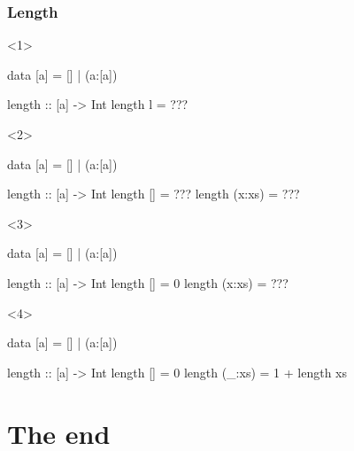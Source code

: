 \documentclass[17pt]{beamer}
\renewcommand{\(}[1]{\begin{columns}[#1]}
\renewcommand{\)}{\end{columns}}
\newcommand{\<}[1]{\begin{column}{#1}}
\renewcommand{\>}{\end{column}}
\begin{document}
\begin{frame}[fragile]
\frametitle{Length}
\begin{minipage}[t][.4\textheight]{\textwidth}
\begin{onlyenv}<1>
  \begin{code}
    data [a] = [] | (a:[a])

    length :: [a] -> Int
    length l = ???
  \end{code}
\end{onlyenv}
\begin{onlyenv}<2>
  \begin{code}
    data [a] = [] | (a:[a])

    length :: [a] -> Int
    length []     = ???
    length (x:xs) = ???
  \end{code}
\end{onlyenv}
\begin{onlyenv}<3>
  \begin{code}
    data [a] = [] | (a:[a])

    length :: [a] -> Int
    length []     = 0
    length (x:xs) = ???
  \end{code}
\end{onlyenv}
\begin{onlyenv}<4>
  \begin{code}
    data [a] = [] | (a:[a])

    length :: [a] -> Int
    length []     = 0
    length (_:xs) = 1 + length xs
  \end{code}
\end{onlyenv}
\end{minipage}
\begin{minipage}[c][.3\textheight]{\textwidth}
\begin{center}
\end{center}
\end{minipage}
\end{frame}




\section{The end}
\end{document}
